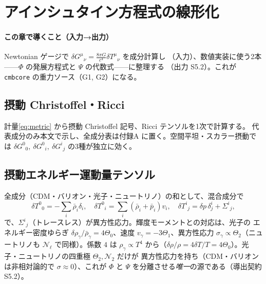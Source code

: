 \section{アインシュタイン方程式の線形化}
\label{ch:ch05_einstein}

\paragraph{この章で導くこと（入力→出力）}
Newtonian ゲージで $\delta G^\mu{}_\nu=\frac{8\pi G}{c^4}\delta T^\mu{}_\nu$ を成分計算し
（入力）、数値実装に使う2本——$\Phi$ の発展方程式と $\Psi$ の代数式——に整理する
（出力 S5.2）。これが \texttt{cmbcore} の重力ソース（G1, G2）になる。

\subsection{摂動 Christoffel・Ricci}
計量\eqref{eq:metric} から摂動 Christoffel 記号、Ricci テンソルを1次で計算する。
代表成分のみ本文で示し、全成分表は付録A に置く。空間平坦・スカラー摂動では
$\delta G^0{}_0,\ \delta G^0{}_i,\ \delta G^i{}_j$ の3種が独立に効く。

\subsection{摂動エネルギー運動量テンソル}
全成分（CDM・バリオン・光子・ニュートリノ）の和として、混合成分で
\begin{equation}
  \delta T^0{}_0=-\sum_i\bar\rho_i\delta_i,\quad
  \delta T^0{}_i=\sum_i(\bar\rho_i+\bar p_i)v_i,\quad
  \delta T^i{}_j=\delta p\,\delta^i_j+\Sigma^i{}_j,
\end{equation}
で、$\Sigma^i{}_j$（トレースレス）が異方性応力。輝度モーメントとの対応は、光子の
エネルギー密度ゆらぎ $\delta\rho_\gamma/\bar\rho_\gamma=4\Theta_0$、速度
$v_\gamma=-3\Theta_1$、異方性応力 $\sigma_\gamma\propto\Theta_2$（ニュートリノも
$\mathcal N_\ell$ で同様）。係数 $4$ は $\rho_\gamma\propto T^4$ から（$\delta\rho/\rho=
4\delta T/T=4\Theta_0$）。光子・ニュートリノの四重極 $\Theta_2,\mathcal N_2$ だけが
異方性応力を持ち（CDM・バリオンは非相対論的で $\sigma\approx0$）、これが $\Phi$ と
$\Psi$ を分離させる\emph{唯一}の源である（導出契約 S5.2）。

